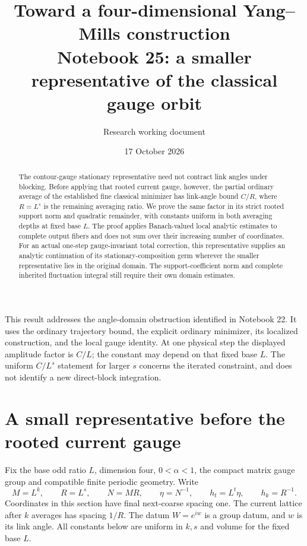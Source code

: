 \documentclass[11pt]{article}
\title{Toward a four-dimensional Yang--Mills construction\\
\large Notebook 25: a smaller representative of the classical gauge orbit}
\author{Research working document}
\date{17 October 2026}
\theoremstyle{remark}
\begin{document}
\maketitle
\begin{abstract}
The contour-gauge stationary representative need not contract
link angles under blocking. Before applying that rooted current
gauge, however, the partial ordinary average of the established
fine classical minimizer has link-angle bound $C/R$, where
$R=L^s$ is the remaining averaging ratio. We prove the same
factor in its strict rooted support norm and quadratic remainder,
with constants uniform in both averaging depths at fixed base
$L$. The proof applies Banach-valued local analytic estimates
to complete output fibers and does not sum over their increasing
number of coordinates. For an actual one-step gauge-invariant
total correction, this representative supplies an analytic
continuation of its stationary-composition germ wherever the
smaller representative lies in the original domain.
The support-coefficient norm and complete inherited fluctuation
integral still require their own domain estimates.
\end{abstract}

This result addresses the angle-domain obstruction identified in
Notebook 22. It uses the ordinary trajectory bound, the explicit
ordinary minimizer, its localized construction, and the local
gauge identity. At one physical step the displayed amplitude
factor is $C/L$; the constant may depend on that fixed base $L$.
The uniform $C/L^s$ statement for larger $s$ concerns the iterated
constraint, and does not identify a new direct-block integration.


\section{A small representative before the rooted current gauge}
\label{sv-section}

Fix the base odd ratio $L$, dimension four, $0<\alpha<1$, the compact
matrix gauge group and compatible finite periodic geometry. Write
\begin{equation}
 M=L^k,\qquad R=L^s,\qquad N=MR,\qquad
 \eta=N^{-1},\qquad h_t=L^t\eta,\qquad h_k=R^{-1}.
 \label{sv-scales}
\end{equation}
Coordinates in this section have final next-coarse spacing one. The
current lattice after $k$ averages has spacing $1/R$. The datum
$W=e^{iw}$ is a group datum, and $w$ is its link angle. All constants
below are uniform in $k,s$ and volume for the fixed base $L$.
\end{document}
